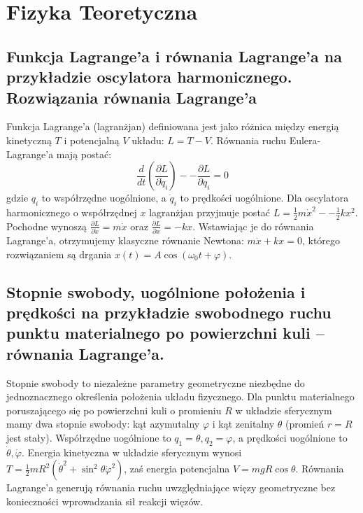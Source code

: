 \documentclass[11pt,a4paper]{article}
\begin{document}
\newpage

\section{Fizyka Teoretyczna}

\subsection{Funkcja Lagrange’a i równania Lagrange’a na przykładzie oscylatora harmonicznego. Rozwiązania równania Lagrange’a}
Funkcja Lagrange’a (lagranżjan) definiowana jest jako różnica między energią kinetyczną $T$ i potencjalną $V$ układu: $L = T - V$. Równania ruchu Eulera-Lagrange’a mają postać:
\begin{equation}
\frac{d}{dt}\left(\frac{\partial L}{\partial \dot{q}_i}\right) -- \frac{\partial L}{\partial q_i} = 0
\end{equation}
gdzie $q_i$ to współrzędne uogólnione, a $\dot{q}_i$ to prędkości uogólnione. Dla oscylatora harmonicznego o współrzędnej $x$ lagranżjan przyjmuje postać $L = \frac{1}{2}m\dot{x}^2 -- \frac{1}{2}kx^2$. Pochodne wynoszą $\frac{\partial L}{\partial \dot{x}} = m\dot{x}$ oraz $\frac{\partial L}{\partial x} = -kx$. Wstawiając je do równania Lagrange’a, otrzymujemy klasyczne równanie Newtona: $m\ddot{x} + kx = 0$, którego rozwiązaniem są drgania $x(t) = A\cos(\omega_0 t + \varphi)$.

\subsection{Stopnie swobody, uogólnione położenia i prędkości na przykładzie swobodnego ruchu punktu materialnego po powierzchni kuli -- równania Lagrange’a.}
Stopnie swobody to niezależne parametry geometryczne niezbędne do jednoznacznego określenia położenia układu fizycznego. Dla punktu materialnego poruszającego się po powierzchni kuli o promieniu $R$ w układzie sferycznym mamy dwa stopnie swobody: kąt azymutalny $\varphi$ i kąt zenitalny $\theta$ (promień $r = R$ jest stały). Współrzędne uogólnione to $q_1 = \theta, q_2 = \varphi$, a prędkości uogólnione to $\dot{\theta}, \dot{\varphi}$. Energia kinetyczna w układzie sferycznym wynosi $T = \frac{1}{2}mR^2(\dot{\theta}^2 + \sin^2\theta \dot{\varphi}^2)$, zaś energia potencjalna $V = mgR\cos\theta$. Równania Lagrange’a generują równania ruchu uwzględniające więzy geometryczne bez konieczności wprowadzania sił reakcji więzów.
\end{document}
